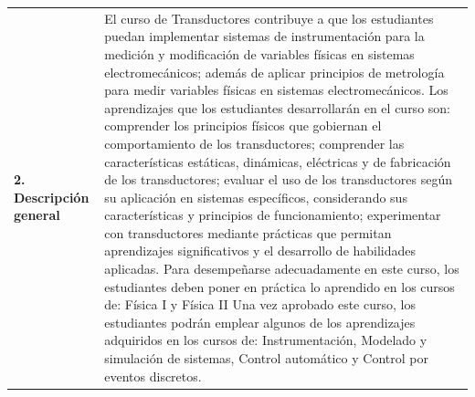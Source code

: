 \documentclass[letterpaper]{article}%
\begin{document}
\begin{tabularx}{\textwidth}{p{3cm}p{13cm}}%
\par\fontsize{12}{14}\selectfont \textbf{\textcolor{parte}{2. Descripción general}}&El curso de Transductores contribuye a que los estudiantes puedan implementar sistemas de instrumentación para la medición y modificación de variables físicas en sistemas electromecánicos; además de aplicar principios de metrología para medir variables físicas en sistemas electromecánicos.
\newline%
\newline%
Los aprendizajes que los estudiantes desarrollarán en el curso son: comprender los principios físicos que gobiernan el comportamiento de los transductores; comprender las características estáticas, dinámicas, eléctricas y de fabricación de los transductores; evaluar el uso de los transductores según su aplicación en sistemas específicos, considerando sus características y principios de funcionamiento; experimentar con transductores mediante prácticas que permitan aprendizajes significativos y el desarrollo de habilidades aplicadas.
\newline%
\newline%
Para desempeñarse adecuadamente en este curso, los estudiantes deben poner en práctica lo aprendido en los cursos de: Física I y Física II 
\newline%
\newline%
Una vez aprobado este curso, los estudiantes podrán emplear algunos de los aprendizajes adquiridos en los cursos de: Instrumentación, Modelado y simulación de sistemas, Control automático y Control por eventos discretos.
\newline%
\newline%
\\%
\end{tabularx}%
\vspace*{4mm}%
\newline%
\end{document}
